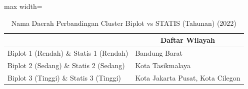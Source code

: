 \begin{table}[H]
\centering
\caption{Nama Daerah Perbandingan Cluster Biplot vs STATIS (Tahunan) (2022)} \label{tab:sample2biplot_statis_comp_name_2022}
\begin{adjustbox}{max width=\textwidth}
\begin{tabular}{|>{\centering\arraybackslash}p{4cm}|p{10cm}|}
\hline
\multicolumn{1}{|c|}{\textbf{Kategori}} & \multicolumn{1}{c|}{\textbf{Daftar Wilayah}} \\
\hline
Biplot 1 (Rendah) \& Statis 1 (Rendah) & Bandung Barat \\
\hline
Biplot 2 (Sedang) \& Statis 2 (Sedang) & Kota Tasikmalaya \\
\hline
Biplot 3 (Tinggi) \& Statis 3 (Tinggi) & Kota Jakarta Pusat, Kota Cilegon \\
\hline
\end{tabular}
\end{adjustbox}
\end{table}